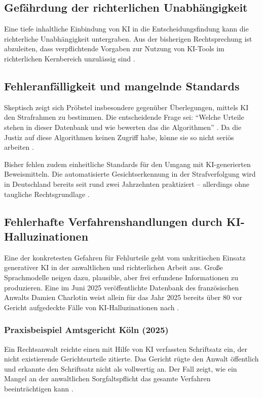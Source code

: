 \documentclass[12pt,a4paper]{article}
\begin{document}
	\subsection{Gefährdung der richterlichen Unabhängigkeit}
	
	Eine tiefe inhaltliche Einbindung von KI in die Entscheidungsfindung kann die richterliche Unabhängigkeit untergraben. Aus der bisherigen Rechtsprechung ist abzuleiten, dass verpflichtende Vorgaben zur Nutzung von KI-Tools im richterlichen Kernbereich unzulässig sind \cite{Anwaltsblatt2025}.
	
	\subsection{Fehleranfälligkeit und mangelnde Standards}
	
	Skeptisch zeigt sich Pröbstel insbesondere gegenüber Überlegungen, mittels KI den Strafrahmen zu bestimmen. Die entscheidende Frage sei: \enquote{Welche Urteile stehen in dieser Datenbank und wie bewerten das die Algorithmen} \cite{SZ2025}. Da die Justiz auf diese Algorithmen keinen Zugriff habe, könne sie so nicht seriös arbeiten \cite{SZ2025}.
	
	Bisher fehlen zudem einheitliche Standards für den Umgang mit KI-generierten Beweismitteln. Die automatisierte Gesichtserkennung in der Strafverfolgung wird in Deutschland bereits seit rund zwei Jahrzehnten praktiziert – allerdings ohne taugliche Rechtsgrundlage \cite{Nomos2025}.
	
	\subsection{Fehlerhafte Verfahrenshandlungen durch KI-Halluzinationen}
	
	Eine der konkretesten Gefahren für Fehlurteile geht vom unkritischen Einsatz generativer KI in der anwaltlichen und richterlichen Arbeit aus. Große Sprachmodelle neigen dazu, plausible, aber frei erfundene Informationen zu produzieren. Eine im Juni 2025 veröffentlichte Datenbank des französischen Anwalts Damien Charlotin weist allein für das Jahr 2025 bereits über 80 vor Gericht aufgedeckte Fälle von KI-Halluzinationen nach \cite{Charlotin2025}.
	
	\subsubsection{Praxisbeispiel Amtsgericht Köln (2025)}
	Ein Rechtsanwalt reichte einen mit Hilfe von KI verfassten Schriftsatz ein, der nicht existierende Gerichtsurteile zitierte. Das Gericht rügte den Anwalt öffentlich und erkannte den Schriftsatz nicht als vollwertig an. Der Fall zeigt, wie ein Mangel an der anwaltlichen Sorgfaltspflicht das gesamte Verfahren beeinträchtigen kann \cite{LTO2025a}.
	
\end{document}
